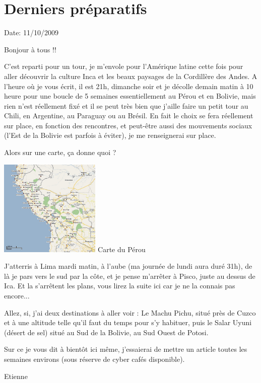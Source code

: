 \section{Derniers préparatifs}

Date: 11/10/2009

\begin{multicols}{2}

Bonjour à tous !!

C'est reparti pour un tour, je m'envole pour l'Amérique latine cette fois pour aller découvrir la culture Inca et les beaux paysages de la Cordillère des Andes. A l'heure où je vous écrit, il est 21h, dimanche soir et je décolle demain matin à 10 heure pour une boucle de 5 semaines essentiellement au Pérou et en Bolivie, mais rien n'est réellement fixé et il se peut très bien que j'aille faire un petit tour au Chili, en Argentine, au Paraguay ou au Brésil. En fait le choix se fera réellement sur place, en fonction des rencontres, et peut-être aussi des mouvements sociaux (l'Est de la Bolivie est parfois à éviter), je me renseignerai sur place.

Alors sur une carte, ça donne quoi ?

\hspace*{-0.65cm}
\includegraphics[width=4.8cm]{articles/Derniers-preparatifs/1255286224vDMd.jpg}
Carte du Pérou


J'atterris à Lima mardi matin, à l'aube (ma journée de lundi aura duré 31h), de là je pars vers le sud par la côte, et je pense m'arrêter à Pisco, juste au dessus de Ica. Et la s'arrêtent les plans, vous lirez la suite ici car je ne la connais pas encore...

Allez, si, j'ai deux destinations à aller voir : Le Machu Pichu, situé près de Cuzco et à une altitude telle qu'il faut du temps pour s'y habituer, puis le Salar Uyuni (désert de sel) situé au Sud de la Bolivie, au Sud Ouest de Potosi.

Sur ce je vous dit à bientôt ici même, j'essaierai de mettre un article toutes les semaines environs (sous réserve de cyber cafés disponible).

Etienne

\end{multicols}


